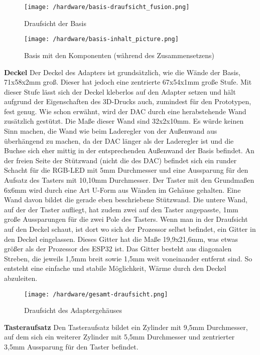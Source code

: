 \documentclass[11pt, twoside]{article}
\begin{document}
\begin{figure}[H]
	\texttt{[image: /hardware/basis-draufsicht\_fusion.png]}
	\caption{Draufsicht der Basis}
\end{figure}
\begin{figure}[H]
	\texttt{[image: /hardware/basis-inhalt\_picture.png]}
	\caption{Basis mit den Komponenten (während des Zusammensetzens)}
\end{figure}
\noindent \textbf{Deckel} \newline
Der Deckel des Adapters ist grundsätzlich, wie die Wände der Basis, 71x58x2mm groß. Dieser hat jedoch eine zentrierte 67x54x1mm große Stufe. Mit dieser Stufe lässt sich der Deckel kleberlos auf den Adapter setzen und hält aufgrund der Eigenschaften des 3D-Drucks auch, zumindest für den Prototypen, fest genug.
Wie schon erwähnt, wird der DAC durch eine herabstehende Wand zusätzlich gestützt. Die Maße dieser Wand sind 32x2x10mm. Es würde keinen Sinn machen, die Wand wie beim Laderegler von der Außenwand aus überhängend zu machen, da der DAC länger als der Laderegler ist und die Buchse sich eher mittig in der entsprechenden Außenwand der Basis befindet.\newline
An der freien Seite der Stützwand (nicht die des DAC) befindet sich ein runder Schacht für die RGB-LED mit 5mm Durchmesser und eine Aussparung für den Aufsatz des Tasters mit 10,10mm Durchmesser. Der Taster mit den Grundmaßen 6x6mm wird durch eine Art U-Form aus Wänden im Gehäuse gehalten. Eine Wand davon bildet die gerade eben beschriebene Stützwand. Die untere Wand, auf der der Taster aufliegt, hat zudem zwei auf den Taster angepasste, 1mm große Aussparungen für die zwei Pole des Tasters.\newline
Wenn man in der Draufsicht auf den Deckel schaut, ist dort wo sich der Prozessor selbst befindet, ein Gitter in den Deckel eingelassen. Dieses Gitter hat die Maße 19,9x21,6mm, was etwas größer als der Prozessor des ESP32 ist. Das Gitter besteht aus diagonalen Streben, die jeweils 1,5mm breit sowie 1,5mm weit voneinander entfernt sind. So entsteht eine einfache und stabile Möglichkeit, Wärme durch den Deckel abzuleiten.\newline
\begin{figure}[H]
	\texttt{[image: /hardware/gesamt-draufsicht.png]}
	\caption{Draufsicht des Adaptergehäuses}
\end{figure}
\noindent \textbf{Tasteraufsatz} \newline
Den Tasteraufsatz bildet ein Zylinder mit 9,5mm Durchmesser, auf dem sich ein weiterer Zylinder mit 5,5mm Durchmesser und zentrierter 3,5mm Aussparung für den Taster befindet.
\vspace{4mm}\newline
\parencite[vgl.][]{noauthor_urlnl12_nodate}\newline
\parencite[vgl.][]{noauthor_urlnl17_nodate}
\end{document}
